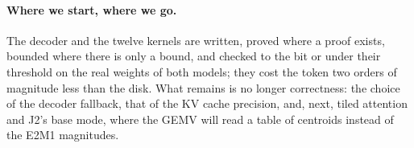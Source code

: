 \paragraph{Where we start, where we go.} The decoder and the twelve kernels are written, proved where a proof exists, bounded where there is only a bound, and checked to the bit or under their threshold on the real weights of both models; they cost the token two orders of magnitude less than the disk. What remains is no longer correctness: the choice of the decoder fallback, that of the KV cache precision, and, next, tiled attention and J2's base mode, where the GEMV will read a table of centroids instead of the E2M1 magnitudes.
